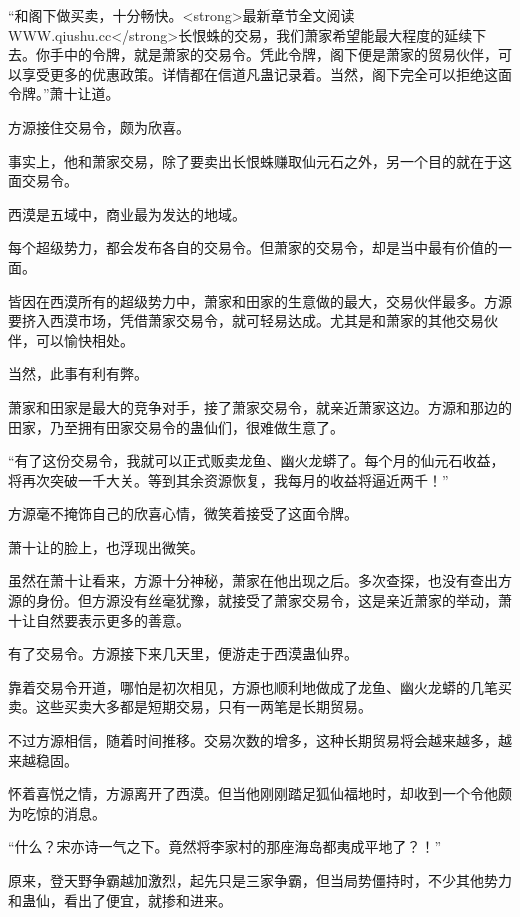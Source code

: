 
\begin{this_body}

“和阁下做买卖，十分畅快。<strong>最新章节全文阅读WWW.qiushu.cc</strong>长恨蛛的交易，我们萧家希望能最大程度的延续下去。你手中的令牌，就是萧家的交易令。凭此令牌，阁下便是萧家的贸易伙伴，可以享受更多的优惠政策。详情都在信道凡蛊记录着。当然，阁下完全可以拒绝这面令牌。”萧十让道。

方源接住交易令，颇为欣喜。

事实上，他和萧家交易，除了要卖出长恨蛛赚取仙元石之外，另一个目的就在于这面交易令。

西漠是五域中，商业最为发达的地域。

每个超级势力，都会发布各自的交易令。但萧家的交易令，却是当中最有价值的一面。

皆因在西漠所有的超级势力中，萧家和田家的生意做的最大，交易伙伴最多。方源要挤入西漠市场，凭借萧家交易令，就可轻易达成。尤其是和萧家的其他交易伙伴，可以愉快相处。

当然，此事有利有弊。

萧家和田家是最大的竞争对手，接了萧家交易令，就亲近萧家这边。方源和那边的田家，乃至拥有田家交易令的蛊仙们，很难做生意了。

“有了这份交易令，我就可以正式贩卖龙鱼、幽火龙蟒了。每个月的仙元石收益，将再次突破一千大关。等到其余资源恢复，我每月的收益将逼近两千！”

方源毫不掩饰自己的欣喜心情，微笑着接受了这面令牌。

萧十让的脸上，也浮现出微笑。

虽然在萧十让看来，方源十分神秘，萧家在他出现之后。多次查探，也没有查出方源的身份。但方源没有丝毫犹豫，就接受了萧家交易令，这是亲近萧家的举动，萧十让自然要表示更多的善意。

有了交易令。方源接下来几天里，便游走于西漠蛊仙界。

靠着交易令开道，哪怕是初次相见，方源也顺利地做成了龙鱼、幽火龙蟒的几笔买卖。这些买卖大多都是短期交易，只有一两笔是长期贸易。

不过方源相信，随着时间推移。交易次数的增多，这种长期贸易将会越来越多，越来越稳固。

怀着喜悦之情，方源离开了西漠。但当他刚刚踏足狐仙福地时，却收到一个令他颇为吃惊的消息。

“什么？宋亦诗一气之下。竟然将李家村的那座海岛都夷成平地了？！”

原来，登天野争霸越加激烈，起先只是三家争霸，但当局势僵持时，不少其他势力和蛊仙，看出了便宜，就掺和进来。


\end{this_body}
